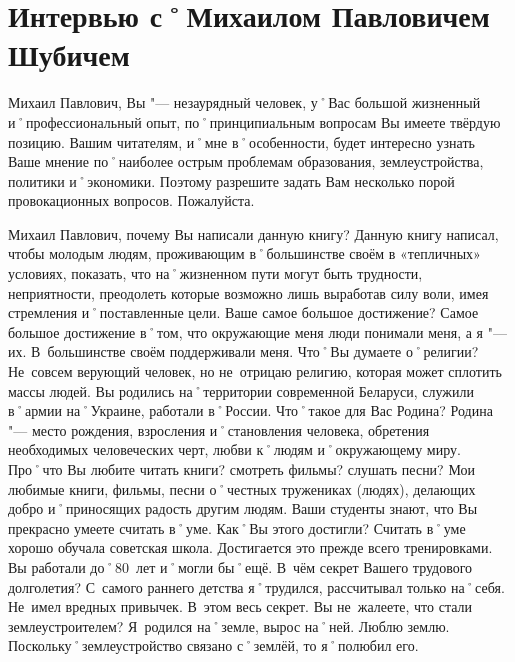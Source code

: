 ﻿\chapter[Интервью с М.\,П.~Шубичем]{Интервью с˚Михаилом Павловичем Шубичем}

\begin{drama}
	\setlength{\speaksindent}{5em}
	\setlength{\Dlabelsep}{5em}
	
	\maxspeaks Михаил Павлович, Вы "--- незаурядный человек, у˚Вас большой жизненный и˚профессиональный опыт, по˚принципиальным вопросам Вы имеете твёрдую позицию. Вашим читателям, и˚мне в˚особенности, будет интересно узнать Ваше мнение по˚наиболее острым проблемам образования, землеустройства, политики и˚экономики. Поэтому разрешите задать Вам несколько порой провокационных вопросов.
	\michaelspeaks Пожалуйста.
	
	\maxspeaks Михаил Павлович, почему Вы написали данную книгу?
	\michaelspeaks Данную книгу написал, чтобы молодым людям, проживающим в˚большинстве своём в «тепличных» условиях, показать, что на˚жизненном пути могут быть трудности, неприятности, преодолеть которые возможно лишь выработав силу воли, имея стремления и˚поставленные цели.
	\maxspeaks Ваше самое большое достижение?
	\michaelspeaks Самое большое достижение в˚том, что окружающие меня люди понимали меня, а я "--- их. В~большинстве своём поддерживали меня.
	\maxspeaks Что˚Вы думаете о˚религии? 
	\michaelspeaks Не~совсем верующий человек, но не~отрицаю религию, которая может сплотить массы людей.
	\maxspeaks Вы родились на˚территории современной Беларуси, служили в˚армии на˚Украине, работали в˚России. Что˚такое для Вас Родина?
	\michaelspeaks Родина "--- место рождения, взросления и˚становления человека, обретения необходимых человеческих черт, любви к˚людям и˚окружающему миру.
	\maxspeaks Про˚что Вы любите читать книги? смотреть фильмы? слушать песни?
	\michaelspeaks Мои любимые книги, фильмы, песни о˚честных тружениках (людях), делающих добро и˚приносящих радость другим людям.
	\maxspeaks Ваши студенты знают, что Вы прекрасно умеете считать в˚уме. Как˚Вы этого достигли?
	\michaelspeaks Считать в˚уме хорошо обучала советская школа. Достигается это прежде всего тренировками.
	\maxspeaks Вы работали до˚80~лет и˚могли бы˚ещё. В~чём секрет Вашего трудового долголетия?
	\michaelspeaks С~самого раннего детства я˚трудился, рассчитывал только на˚себя. Не~имел вредных привычек. В~этом весь секрет. 
	\maxspeaks Вы не~жалеете, что стали землеустроителем?
	\michaelspeaks Я~родился на˚земле, вырос на˚ней. Люблю землю. Поскольку˚землеустройство связано с˚землёй, то я˚полюбил его.


\end{drama}
